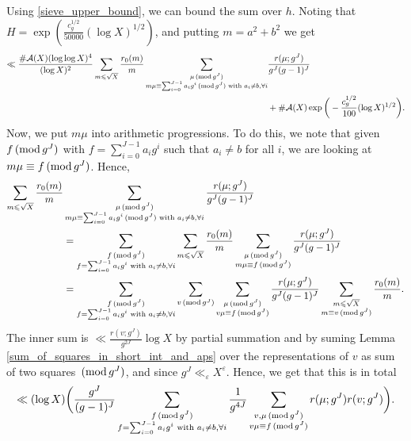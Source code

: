 \documentclass[12pt]{amsart}
\theoremstyle{definition}
\theoremstyle{definition}
\theoremstyle{remark}
\numberwithin{equation}{section}
\newcommand{\CA}{\mathcal{A}}
\renewcommand{\leq}{\leqslant}
\renewcommand{\mod}[1]{\,({\rm mod}\,#1)}
\begin{document}
Using \eqref{sieve_upper_bound}, we can bound the sum over $h$. Noting that $H=\exp( \frac{c_g^{1/2}}{50000}(\log X)^{1/2})$, and putting $m=a^2+b^2$ we get
\begin{align*}
\ll \frac{\#\CA(X)(\log\log X)^4}{(\log X)^2} \sum_{m\leq \sqrt{X}} \frac{r_0(m)}{m} \sum_{\substack{\mu \mod{g^J} \\ m\mu \equiv \sum_{i=0}^{J-1}a_ig^i \mod{g^J} \text{ with } a_i\not=b, \forall i}}& \frac{r(\mu ; g^J)}{g^J(g-1)^J}  \\
&+ \#\CA(X) \exp\bigg( - \frac{c_g^{1/2}}{100} (\log X)^{1/2}  \bigg) . 
\end{align*}
Now, we put $m\mu$ into arithmetic progressions. To do this, we note that given $f\mod{g^J}$ with $f=\sum_{i=0}^{J-1}a_i g^i$ such that $a_i\not=b$ for all $i$, we are looking at $m\mu\equiv f \mod{g^J}$. Hence,
\begin{align*}
\sum_{m\leq \sqrt{X}} \frac{r_0(m)}{m} &\sum_{\substack{\mu \mod{g^J} \\ m\mu \equiv \sum_{i=0}^{J-1}a_ig^i \mod{g^J} \text{ with } a_i\not=b, \forall i}} \frac{r(\mu ; g^J)}{g^J(g-1)^J}  \\
&= \sum_{\substack{f \mod{g^J} \\ f = \sum_{i=0}^{J-1}a_ig^i \text{ with } a_i\not=b, \forall i}} \sum_{m\leq \sqrt{X}} \frac{r_0(m)}{m} \sum_{\substack{\mu\mod{g^J} \\ m\mu \equiv f \mod{g^J}}} \frac{r(\mu ; g^J)}{g^J(g-1)^J} \\
&=  \sum_{\substack{f \mod{g^J} \\ f = \sum_{i=0}^{J-1}a_ig^i \text{ with } a_i\not=b, \forall i}} \sum_{v\mod{g^J}} \sum_{\substack{\mu\mod{g^J} \\ v\mu\equiv f \mod{g^J}}} \frac{r(\mu ; g^J)}{g^J(g-1)^J} \sum_{\substack{m\leq \sqrt{X} \\ m\equiv v \mod{g^J}}} \frac{r_0(m)}{m}.
\end{align*}
The inner sum is $\ll \frac{r(v;g^J)}{g^{2J}} \log X$ by partial summation and by suming Lemma \ref{sum_of_squares_in_short_int_and_aps} over the representations of $v$ as sum of two squares $\mod{g^J}$, and since $g^J \ll_{\varepsilon} X^{\varepsilon}$. Hence, we get that this is in total
$$ \ll (\log X) \bigg( \frac{g^J}{(g-1)^J} \sum_{\substack{f \mod{g^J} \\ f = \sum_{i=0}^{J-1}a_ig^i \text{ with } a_i\not=b, \forall i}} \frac{1}{g^{4J}} \sum_{\substack{v , \mu\mod{g^J} \\ v\mu\equiv f \mod{g^J}}} r(\mu ; g^J) r(v ; g^J) \bigg) . $$
\end{document}
